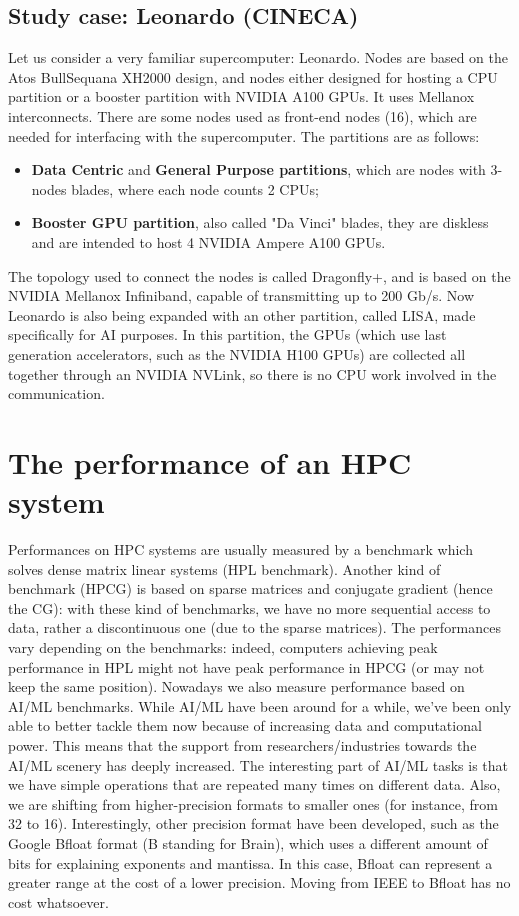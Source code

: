 \subsection{Study case: Leonardo (CINECA)}

Let us consider a very familiar supercomputer: Leonardo. Nodes are based on the Atos BullSequana XH2000 design, and nodes either designed for hosting a CPU partition or a booster partition with NVIDIA A100 GPUs. It uses Mellanox interconnects.
\nwl
There are some nodes used as front-end nodes (16), which are needed for interfacing with the supercomputer. The partitions are as follows:
\begin{itemize}
    \item \textbf{Data Centric} and \textbf{General Purpose partitions}, which are nodes with 3-nodes blades, where each node counts 2 CPUs;
    \item \textbf{Booster GPU partition}, also called "Da Vinci" blades, they are diskless and are intended to host 4 NVIDIA Ampere A100 GPUs.
\end{itemize}

The topology used to connect the nodes is called Dragonfly+, and is based on the NVIDIA Mellanox Infiniband, capable of transmitting up to 200 Gb/s.
\nwl
Now Leonardo is also being expanded with an other partition, called LISA, made specifically for AI purposes. In this partition, the GPUs (which use last generation accelerators, such as the NVIDIA H100 GPUs) are collected all together through an NVIDIA NVLink, so there is no CPU work involved in the communication.

\section{The performance of an HPC system}

Performances on HPC systems are usually measured by a benchmark which solves dense matrix linear systems (HPL benchmark). Another kind of benchmark (HPCG) is based on sparse matrices and conjugate gradient (hence the CG): with these kind of benchmarks, we have no more sequential access to data, rather a discontinuous one (due to the sparse matrices).
\nwl
The performances vary depending on the benchmarks: indeed, computers achieving peak performance in HPL might not have peak performance in HPCG (or may not keep the same position).
\nwl
Nowadays we also measure performance based on AI/ML benchmarks. While AI/ML have been around for a while, we've been only able to better tackle them now because of increasing data and computational power. This means that the support from researchers/industries towards the AI/ML scenery has deeply increased. The interesting part of AI/ML tasks is that we have simple operations that are repeated many times on different data.
\nwl
Also, we are shifting from higher-precision formats to smaller ones (for instance, from 32 to 16). Interestingly, other precision format have been developed, such as the Google Bfloat format (B standing for Brain), which uses a different amount of bits for explaining exponents and mantissa. In this case, Bfloat can represent a greater range at the cost of a lower precision. Moving from IEEE to Bfloat has no cost whatsoever.

